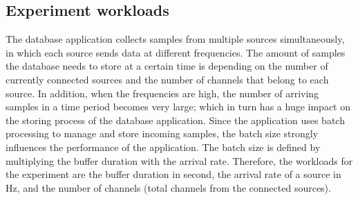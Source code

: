 \subsection{Experiment workloads}
The database application collects samples from multiple sources simultaneously, in which each source sends data at different frequencies. The amount of samples the database needs to store at a certain time is depending on the number of currently connected sources and the number of channels that belong to each source. In addition, when the frequencies are high, the number of arriving samples in a time period becomes very large; which in turn has a huge impact on the storing process of the database application. Since the application uses batch processing to manage and store incoming samples, the batch size strongly influences the performance of the application. The batch size is defined by multiplying the buffer duration with the arrival rate. Therefore, the workloads for the experiment are the buffer duration in second, the arrival rate of a source in Hz, and the number of channels (total channels from the connected sources).
